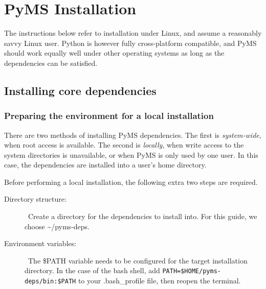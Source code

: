 

\chapter{PyMS Installation}

The instructions below refer to installation under Linux, and assume
a reasonably savvy Linux user.  Python is however fully cross-platform
compatible, and PyMS should work equally well under other operating
systems as long as the dependencies can be satisfied.

\section{Installing core dependencies}

\subsection{Preparing the environment for a local installation}

There are two methods of installing PyMS dependencies. The first is
{\it system-wide}, when root access is available. The second is {\it locally},
when write access to the system directories is unavailable, or when PyMS is
only used by one user. In this case, the dependencies are installed into a
user's home directory.

Before performing a local installation, the following extra two steps are
required.

\begin{description}
  \item [Directory structure:] \
        Create a directory for the dependencies to install into. For this
        guide, we choose \~{}/pyms-deps.
  \item [Environment variables:] \
        The \$PATH variable needs to be configured for the target installation
        directory. In the case of the bash shell, add
        {\tt PATH=\$HOME/pyms-deps/bin:\$PATH} to your .bash\_profile file,
        then reopen the terminal.
\end{description}

